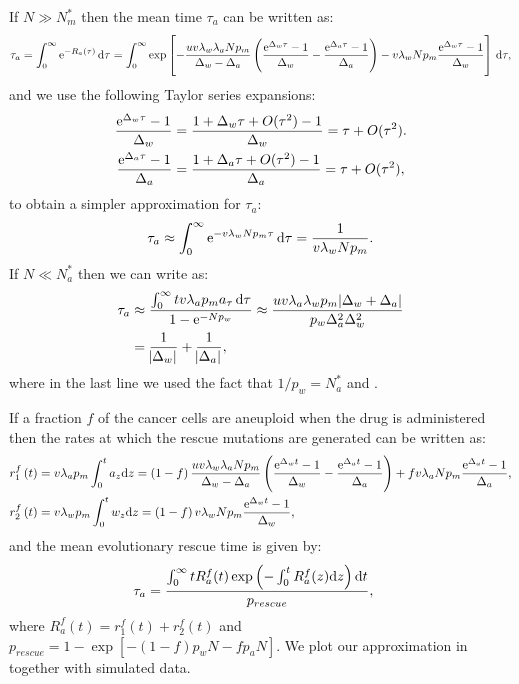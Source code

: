 \documentclass[12pt]{extarticle}
\renewcommand{\d}[1]{\ensuremath{\operatorname{d}\!{#1}}}
\renewcommand{\d}{{\rm d}}
\newcommand{\e}{{\rm e}}
\begin{document}
\begin{appendices}
If $N\gg N_m^*$ then the mean time $\tau_a$ can be written as:
\begin{align*}
\tau_a=\int_0^\infty\e^{-R_a\left(\tau\right)}\,\d\tau=\int_0^\infty\exp\left[-\frac{uv\lambda_w\lambda_aNp_m}{\Delta_w-\Delta_a}\left(\frac{\e^{\Delta_w\tau}-1}{\Delta_w}-\frac{\e^{\Delta_a\tau}-1}{\Delta_a}\right)-v\lambda_wNp_m\frac{\e^{\Delta_w\tau}-1}{\Delta_w}\right]\,\d\tau,
\end{align*}
and we use the following Taylor series expansions:
\begin{align*}
\frac{\e^{\Delta_w\tau}-1}{\Delta_w}&=\frac{1+\Delta_w\tau+O(\tau^2)-1}{\Delta_w}=\tau+O(\tau^2).\\
\frac{\e^{\Delta_a\tau}-1}{\Delta_a}&=\frac{1+\Delta_a\tau+O(\tau^2)-1}{\Delta_a}=\tau+O(\tau^2),
\end{align*}
to obtain a simpler approximation for $\tau_a$:
\begin{align}\label{limitapprox3}
\tau_a\approx\int_0^\infty\e^{-v\lambda_wNp_m\tau}\,\d\tau=\frac{1}{v\lambda_wNp_m}.
\end{align}
If $N\ll N_a^*$ then we can write  as:
\begin{align}\nonumber
\tau_a&\approx\frac{\int_0^\infty tv\lambda_ap_ma_\tau\,\d\tau}{1-\e^{-Np_w}}\approx\frac{uv\lambda_a\lambda_wp_m\abs{\Delta_w+\Delta_a}}{p_w\Delta_a^2\Delta_w^2}\\ \label{limitapprox4}
&=\frac{1}{\abs{\Delta_w}}+\frac{1}{\abs{\Delta_a}},
\end{align}
where in the last line we used the fact that $1/p_w=N_a^*$ and .

If a fraction $f$ of the cancer cells are aneuploid when the drug is administered then the rates at which the rescue mutations are generated can be written as:
\begin{align*}
r_1^f\left(t\right)&=v\lambda_ap_m\int_0^ta_{z} \d z = \left(1-f\right)\frac{uv\lambda_w\lambda_aNp_m}{\Delta_w-\Delta_a}\left(\frac{\e^{\Delta_wt}-1}{\Delta_w}-\frac{\e^{\Delta_at}-1}{\Delta_a}\right)+fv\lambda_aNp_m\frac{\e^{\Delta_a t}-1}{\Delta_a},\\ 
r_2^f\left(t\right)&=v\lambda_wp_m\int_0^tw_{z} \d z = \left(1-f\right)v\lambda_wNp_m\frac{\e^{\Delta_w t}-1}{\Delta_w},
\end{align*} 
and the mean evolutionary rescue time is given by:
\begin{align}\label{meantimet2SGV}
\tau_a &= \frac{\int_{0}^{\infty}{tR_a^f(t)\exp\left(-\int_0^{t}{R_a^f(z)\d z}\right) \d t}}{p_{rescue}},
\end{align}
where $R_a^f(t)=r_1^f\left(t\right)+r_2^f\left(t\right)$ and $p_{rescue}=1-\exp\left[-\left(1-f\right)p_wN-fp_aN\right]$. We plot our approximation in   together with simulated data.


\end{appendices}
\end{document}
